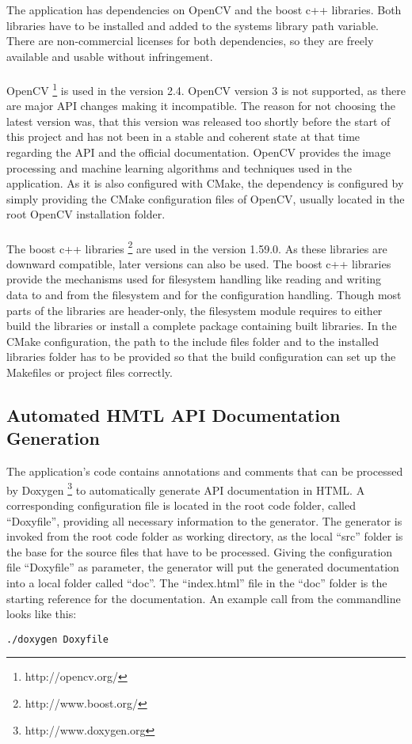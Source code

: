 The application has dependencies on OpenCV and the boost c++ libraries. Both libraries have to be installed and added to the systems library path variable. There are non-commercial licenses for both dependencies, so they are freely available and usable without infringement.
\\
\\
OpenCV \footnote{http://opencv.org/} is used in the version 2.4. OpenCV version 3 is not supported, as there are major API changes making it incompatible. The reason for not choosing the latest version was, that this version was released too shortly before the start of this project and has not been in a stable and coherent state at that time regarding the API and the official documentation. OpenCV provides the image processing and machine learning algorithms and techniques used in the application. As it is also configured with CMake, the dependency is configured by simply providing the CMake configuration files of OpenCV, usually located in the root OpenCV installation folder.
\\
\\
The boost c++ libraries \footnote{http://www.boost.org/} are used in the version 1.59.0. As these libraries are downward compatible, later versions can also be used. The boost c++ libraries provide the mechanisms used for filesystem handling like reading and writing data to and from the filesystem and for the configuration handling. Though most parts of the libraries are header-only, the filesystem module requires to either build the libraries or install a complete package containing built libraries. In the CMake configuration, the path to the include files folder and to the installed libraries folder has to be provided so that the build configuration can set up the Makefiles or project files correctly.


\subsection{Automated HMTL API Documentation Generation}

The application's code contains annotations and comments that can be processed by Doxygen \footnote{http://www.doxygen.org} to automatically generate API documentation in HTML. A corresponding configuration file is located in the root code folder, called "`Doxyfile"', providing all necessary information to the generator. The generator is invoked from the root code folder as working directory, as the local "`src"' folder is the base for the source files that have to be processed. Giving the configuration file "`Doxyfile"' as parameter, the generator will put the generated documentation into a local folder called "`doc"'. The "`index.html"' file in the "`doc"' folder is the starting reference for the documentation. An example call from the commandline looks like this:
\begin{verbatim}
./doxygen Doxyfile
\end{verbatim}


